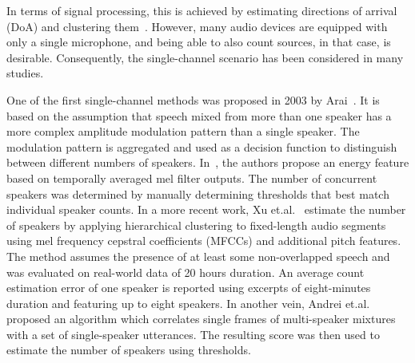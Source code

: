 In terms of signal processing, this is achieved by estimating directions of arrival (DoA) and clustering them~\cite{loesch08, araki09, arberet10, pavlidi12, drude14_icassp, mirzaei15, walter15, Pasha17_reverb}.
However, many audio devices are equipped with only a single microphone, and being able to also count sources, in that case, is desirable.
Consequently, the single-channel scenario has been considered in many studies.
\par
One of the first single-channel methods was proposed in 2003 by Arai~\cite{arai03}.
It is based on the assumption that speech mixed from more than one speaker has a more complex amplitude modulation pattern than a single speaker.
The modulation pattern is aggregated and used as a decision function to distinguish between different numbers of speakers.
In~\cite{sayoud10}, the authors propose an energy feature based on temporally averaged mel filter outputs.
The number of concurrent speakers was determined by manually determining thresholds that best match individual speaker counts.
In a more recent work,
Xu et.al.~\cite{xu13} estimate the number of speakers by applying hierarchical clustering to fixed-length audio segments using mel frequency cepstral coefficients (MFCCs) and additional pitch features.
The method assumes the presence of at least some non-overlapped speech and was evaluated on real-world data of 20 hours duration.
An average count estimation error of one speaker is reported using excerpts of eight-minutes duration and featuring up to eight speakers.
In another vein, Andrei et.al.~\cite{andrei15, andrei15a} proposed an algorithm which correlates single frames of multi-speaker mixtures with a set of single-speaker utterances.
The resulting score was then used to estimate the number of speakers using thresholds.

\par

